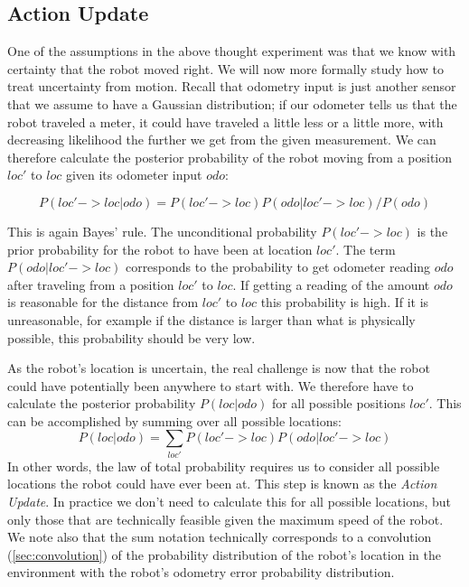 \subsection{Action Update}
One of the assumptions in the above thought experiment was that we know with certainty that the robot moved right. We will now more formally study how to treat uncertainty from motion. Recall that odometry input is just another sensor that we assume to have a Gaussian distribution; if our odometer tells us that the robot traveled a meter, it could have traveled a little less or a little more, with decreasing likelihood the further we get from the given measurement. We can therefore calculate the posterior probability of the robot moving from a position $loc'$ to $loc$ given its odometer input $odo$:

\begin{equation}
P(loc'->loc|odo)=P(loc'->loc)P(odo|loc'->loc)/P(odo)
\end{equation}

This is again Bayes' rule. The unconditional probability $P(loc'->loc)$ is the prior probability for the robot to have been at location $loc'$. The term $ P(odo|loc'->loc)$ corresponds to the probability to get odometer reading $odo$ after traveling from a position $loc'$ to $loc$. If getting a reading of the amount $odo$ is reasonable for the distance from $loc'$ to $loc$ this probability is high. If it is unreasonable, for example if the distance is larger than what is physically possible, this probability should be very low.

As the robot's location is uncertain, the real challenge is now that the robot could have potentially been anywhere to start with. We therefore have to calculate the posterior probability $P(loc|odo)$ for all possible positions $loc'$. This can be accomplished by summing over all possible locations:
\begin{equation}
P(loc|odo)=\sum_{loc'}P(loc'->loc)P(odo|loc'->loc)
\end{equation}
In other words, the law of total probability requires us to consider all possible locations the robot could have ever been at. This step is known as the \textsl{Action Update}. In practice we don't need to calculate this for all possible locations, but only those that are technically feasible given the maximum speed of the robot. We note also that the sum notation technically corresponds to a convolution (\cref{sec:convolution}) of the probability distribution of the robot's location in the environment with the robot's odometry error probability distribution.

